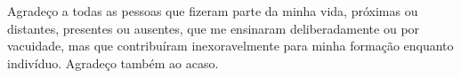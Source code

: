 Agradeço a todas as pessoas que fizeram parte da minha vida, próximas ou distantes, presentes ou ausentes, que me ensinaram deliberadamente ou por vacuidade, mas que contribuíram inexoravelmente para minha formação enquanto indivíduo. Agradeço também ao acaso.
